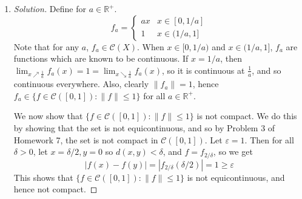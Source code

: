 \documentclass{article}
\newcommand{\R}{{\mathbb R}}
\newcommand{\ep}{{\varepsilon}}
\theoremstyle{remark}
\begin{document}
\begin{enumerate}
\begin{proof}[Solution]
		Finally, this shows that $\mathcal{F}$ is a compact subset of $\mathcal{C}(X)$.
	\end{proof}
	\item \begin{proof}[Solution]\let\qed\relax
		Define for $a \in \R^+$.
		\[
			f_a = \begin{cases}
				ax & x \in [0,1/a]\\
				1 & x \in (1/a,1]
			\end{cases}
		\]
		Note that for any $a$, $f_a \in \mathcal{C}(X)$.
		When $x \in [0,1/a)$ and $x \in (1/a,1]$, $f_a$ are functions which are
		known to be continuous.
		If $x = 1/a$, then $\lim_{x\nearrow \frac1a} f_a(x) = 1 = \lim_{x\searrow \frac1a}f_a(x)$,
		so it is continuous at $\frac{1}{a}$,
		and so continuous everywhere.
		Also, clearly $\lVert f_a \rVert = 1$,
		hence $f_a \in \{f \in \mathcal{C}([0,1]) \colon \lVert f \rVert \leq 1\}$
		for all $a \in \R^+$.

		We now show that $\{f \in \mathcal{C}([0,1]) \colon \lVert f \rVert \leq 1\}$
		is not compact.
		We do this by showing that the set is not equicontinuous,
		and so by Problem 3 of Homework 7, the set is not compact in $\mathcal{C}([0,1])$.
		Let $\ep = 1$. Then for all $\delta > 0$,
		let $x = \delta/2, y = 0$ so $d(x,y) < \delta$, and $f = f_{2/\delta}$, so we get
		\[
			|f(x) - f(y)| = |f_{2/\delta}(\delta/2)| = 1 \geq \ep
		\]
		This shows that $\{f \in \mathcal{C}([0,1]) \colon \lVert f \rVert \leq 1\}$
		is not equicontinuous, and hence not compact.
	\end{proof}
\end{enumerate}
\end{document}
